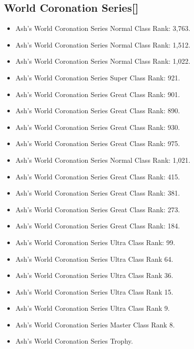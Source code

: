 \documentclass[a4paper,12pt]{article}
\begin{document}
\subsection*{World Coronation Series[]}\n\n\begin{itemize}
\item Ash's World Coronation Series Normal Class Rank: 3,763.
\item Ash's World Coronation Series Normal Class Rank: 1,512.
\item Ash's World Coronation Series Normal Class Rank: 1,022.
\item Ash's World Coronation Series Super Class Rank: 921.
\item Ash's World Coronation Series Great Class Rank: 901.
\item Ash's World Coronation Series Great Class Rank: 890.
\item Ash's World Coronation Series Great Class Rank: 930.
\item Ash's World Coronation Series Great Class Rank: 975.
\item Ash's World Coronation Series Normal Class Rank: 1,021.
\item Ash's World Coronation Series Great Class Rank: 415.
\item Ash's World Coronation Series Great Class Rank: 381.
\item Ash's World Coronation Series Great Class Rank: 273.
\item Ash's World Coronation Series Great Class Rank: 184.
\item Ash's World Coronation Series Ultra Class Rank: 99.
\item Ash's World Coronation Series Ultra Class Rank 64.
\item Ash's World Coronation Series Ultra Class Rank 36.
\item Ash's World Coronation Series Ultra Class Rank 15.
\item Ash's World Coronation Series Ultra Class Rank 9.
\item Ash's World Coronation Series Master Class Rank 8.
\item Ash's World Coronation Series Trophy.
\end{itemize}\\ \par \vspace{0.5cm}
\end{document}
